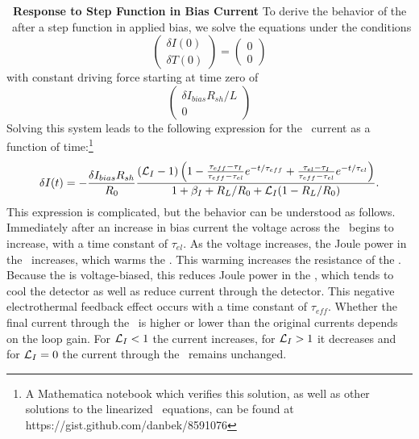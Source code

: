\textbf{\TES\ Response to Step Function in Bias Current}
To derive the behavior of the \TES\ after a step function in applied bias, we solve the equations under the conditions
\begin{equation}
\begin{pmatrix} \delta I(0) \\ \delta T(0) \end{pmatrix} = \begin{pmatrix} 0 \\ 0 \end{pmatrix}
\end{equation}
with constant driving force starting at time zero of
\begin{equation}
\begin{pmatrix} \delta I_{bias} R_{sh} / L \\ 0 \end{pmatrix}
\end{equation}
Solving this system leads to the following expression for the \TES\ current as a function of time:\footnote{A Mathematica notebook which verifies this solution, as well as other solutions to the linearized \TES\ equations, can be found at https://gist.github.com/danbek/8591076}
\begin{equation}\label{eqn:bias-step-resp}
\delta I (t)
   = - \frac{\delta I_{bias} R_{sh}}{R_0} 
       \frac{(\mathcal{L}_I - 1)
             \left(1 - \frac{\tau_{eff} - \tau_I}{\tau_{eff} - \tau_{el}} e^{-t/\tau_{eff}}
                 	       + \frac{\tau_{el} - \tau_I}{\tau_{eff} - \tau_{el}} e^{-t/\tau_{el}} \right)}
            {1 + \beta_I + R_L/R_0 + \mathcal{L}_I(1 - R_L/R_0)}
       .
\end{equation}
This expression is complicated, but the behavior can be understood as follows.
Immediately after an increase in bias current the voltage across the \TES\ begins to increase, with a time constant of $\tau_{el}$.
As the voltage increases, the Joule power in the \TES\ increases, which warms the \TES.
This warming increases the resistance of the \TES.
Because the \TES is voltage-biased, this reduces Joule power in the \TES, which tends to cool the detector as well as reduce current through the detector.
This negative electrothermal feedback effect occurs with a time constant of $\tau_{eff}$.
Whether the final current through the \TES\ is higher or lower than the original currents depends on the loop gain.
For $\mathcal{L}_I < 1$ the current increases, for $\mathcal{L}_I > 1$ it decreases and for $\mathcal{L}_I = 0$ the current through the \TES\ remains unchanged.

